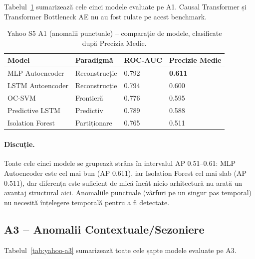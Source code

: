 Tabelul~\ref{tab:yahoo-a1} sumarizează cele cinci modele evaluate pe A1. Causal Transformer și Transformer Bottleneck AE nu au fost rulate pe acest benchmark.

\begin{table}[h]
\centering
\begin{tabular}{@{}llll@{}}
\toprule
Model & Paradigmă & ROC-AUC & Precizie Medie \\
\midrule
MLP Autoencoder  & Reconstrucție & 0.792 & \textbf{0.611} \\
LSTM Autoencoder & Reconstrucție & 0.794 & 0.600 \\
OC-SVM           & Frontieră       & 0.776 & 0.595 \\
Predictive LSTM  & Predictiv     & 0.789 & 0.588 \\
Isolation Forest & Partiționare      & 0.765 & 0.511 \\
\bottomrule
\end{tabular}
\caption{Yahoo S5 A1 (anomalii punctuale) -- comparație de modele, clasificate după Precizia Medie.}
\label{tab:yahoo-a1}
\end{table}

\paragraph{Discuție.} Toate cele cinci modele se grupează strâns în intervalul AP 0.51--0.61: MLP Autoencoder este cel mai bun (AP 0.611), iar Isolation Forest cel mai slab (AP 0.511), dar diferența este suficient de mică încât nicio arhitectură nu arată un avantaj structural aici. 
Anomaliile punctuale (vârfuri pe un singur pas temporal) nu necesită înțelegere temporală pentru a fi detectate.

\subsection{A3 -- Anomalii Contextuale/Sezoniere}

Tabelul~\ref{tab:yahoo-a3} sumarizează toate cele șapte modele evaluate pe A3.

